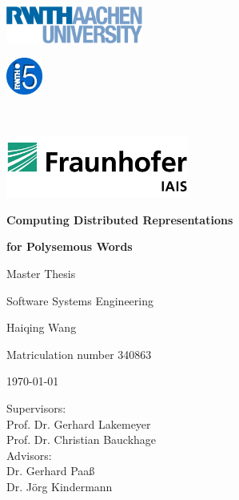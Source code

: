 \thispagestyle{empty}

\parbox{0.5cm}{\ }
   \parbox{5.1cm}{
   \includegraphics[width=4.5cm]{rwth.jpg}}
  \parbox{2cm}{
    \includegraphics[width=1.2cm]{i5-300.jpg}}
    \parbox{1.2cm}{\ }
  \parbox{7cm}{
    \includegraphics[width=6cm]{iais.jpg}}  

\vspace*{3cm}
\centerline{{\Large\bf Computing Distributed Representations }}

\vspace*{4mm}

\centerline{{\Large\bf for Polysemous Words}}

\vspace{2cm}

\centerline{Master Thesis}
\centerline{Software Systems Engineering}

\vspace{2cm}

\centerline{{\large Haiqing Wang}}
\centerline{Matriculation number 340863}

\vspace{10mm}

\centerline{\today}

\vspace{10mm}

\begin{center}
\begin{minipage}[t]{8cm}
Supervisors: \\
\hspace*{2cm} Prof. Dr. Gerhard Lakemeyer \\
\hspace*{2cm} Prof. Dr. Christian Bauckhage\\[1cm]
Advisors: \\
\hspace*{2cm} Dr. Gerhard Paaß\\
\hspace*{2cm} Dr. Jörg Kindermann\\
\end{minipage}
\end{center}
